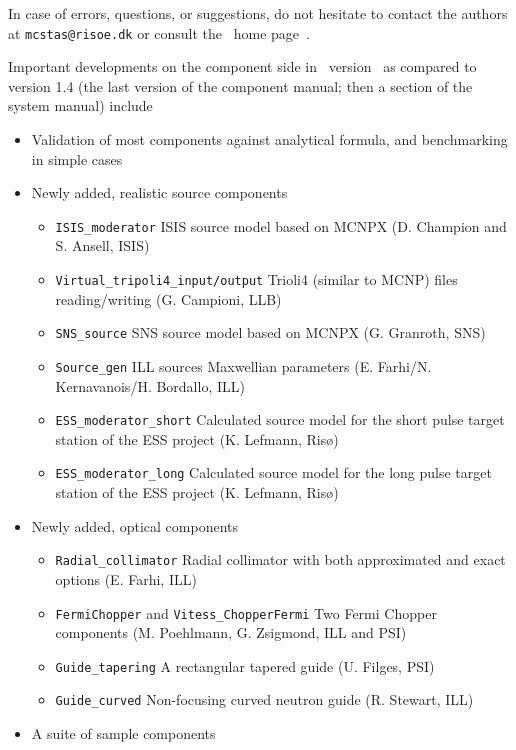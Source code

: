 In case of errors, questions, or suggestions,
do not hesitate to
contact the authors at \verb+mcstas@risoe.dk+
or consult the \MCS\ home page~\cite{mcstas_webpage}.

Important developments on the component side in \MCS\ version \version\
as compared to version 1.4 (the last version of the component manual;
then a section of the system manual) include

\begin{itemize}
\item{Validation of most components against analytical formula,
and benchmarking in simple cases}
\item{Newly added, realistic source components}
  \begin{itemize}
  \item \verb+ISIS_moderator+ ISIS source model based on MCNPX (D. Champion and S. Ansell, ISIS)
  \item \verb+Virtual_tripoli4_input/output+ Trioli4 (similar to MCNP) files reading/writing (G. Campioni, LLB)
  \item \verb+SNS_source+ SNS source model based on MCNPX (G. Granroth, SNS)
  \item \verb+Source_gen+ ILL sources Maxwellian parameters (E. Farhi/N. Kernavanois/H. Bordallo, ILL)
  \item \verb+ESS_moderator_short+ Calculated source model for the short pulse target station of the ESS project (K. Lefmann, Ris\o )
  \item \verb+ESS_moderator_long+ Calculated source model for the long pulse target station of the ESS project (K. Lefmann, Ris\o )
  \end{itemize}
\item{Newly added, optical components}
  \begin{itemize}
  \item \verb+Radial_collimator+ Radial collimator with both approximated and exact options (E. Farhi, ILL)
  \item \verb+FermiChopper+ and \verb+Vitess_ChopperFermi+ Two Fermi Chopper components (M. Poehlmann, G. Zsigmond, ILL and PSI)
  \item \verb+Guide_tapering+ A rectangular tapered guide (U. Filges, PSI)
  \item \verb+Guide_curved+  Non-focusing curved neutron guide (R. Stewart, ILL)
  \end{itemize}
\item{A suite of sample components}
  \begin{itemize}

\end{itemize}
\end{itemize}
